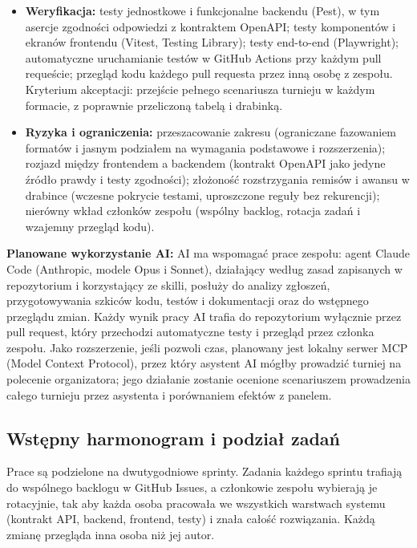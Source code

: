 \documentclass[11pt,a4paper,oneside]{article}
\newif\ifpodpowiedzi
\newcommand{\podpowiedz}[1]{\ifpodpowiedzi\par\begingroup\small\color{hintcolor}\textit{Wskazówka: #1}\par\endgroup\fi}
\begin{document}
\begin{itemize}
\item \textbf{Weryfikacja:} testy jednostkowe i funkcjonalne backendu (Pest), w tym asercje zgodności odpowiedzi z kontraktem OpenAPI; testy komponentów i ekranów frontendu (Vitest, Testing Library); testy end-to-end (Playwright); automatyczne uruchamianie testów w GitHub Actions przy każdym pull requeście; przegląd kodu każdego pull requesta przez inną osobę z zespołu. Kryterium akceptacji: przejście pełnego scenariusza turnieju w każdym formacie, z poprawnie przeliczoną tabelą i drabinką.
\item \textbf{Ryzyka i ograniczenia:} przeszacowanie zakresu (ograniczane fazowaniem formatów i jasnym podziałem na wymagania podstawowe i rozszerzenia); rozjazd między frontendem a backendem (kontrakt OpenAPI jako jedyne źródło prawdy i testy zgodności); złożoność rozstrzygania remisów i awansu w drabince (wczesne pokrycie testami, uproszczone reguły bez rekurencji); nierówny wkład członków zespołu (wspólny backlog, rotacja zadań i wzajemny przegląd kodu).
\end{itemize}

\podpowiedz{Jeżeli przewidujecie wykorzystanie AI, określcie, czy ma wspomagać prace, stanowić część rozwiązania, czy pełnić obie role. Jeśli AI jest elementem wymagań projektu, wskażcie sposób oceny jej działania. Gdy nie planujecie AI, wpiszcie tę informację.}
\textbf{Planowane wykorzystanie AI:} AI ma wspomagać prace zespołu: agent Claude Code (Anthropic, modele Opus i Sonnet), działający według zasad zapisanych w repozytorium i korzystający ze skilli, posłuży do analizy zgłoszeń, przygotowywania szkiców kodu, testów i dokumentacji oraz do wstępnego przeglądu zmian. Każdy wynik pracy AI trafia do repozytorium wyłącznie przez pull request, który przechodzi automatyczne testy i przegląd przez członka zespołu. Jako rozszerzenie, jeśli pozwoli czas, planowany jest lokalny serwer MCP (Model Context Protocol), przez który asystent AI mógłby prowadzić turniej na polecenie organizatora; jego działanie zostanie ocenione scenariuszem prowadzenia całego turnieju przez asystenta i porównaniem efektów z panelem.

\subsection{Wstępny harmonogram i podział zadań}
\podpowiedz{Podziel prace na etapy z konkretnymi terminami i sprawdzalnymi rezultatami. Wskaż osoby odpowiedzialne; przy zadaniach wspólnych określ indywidualne obowiązki. Uwzględnij czas na integrację, testy, dokumentację, nagranie i poprawki. W razie potrzeby dodaj wiersze.}
Prace są podzielone na dwutygodniowe sprinty. Zadania każdego sprintu trafiają do wspólnego backlogu w GitHub Issues, a członkowie zespołu wybierają je rotacyjnie, tak aby każda osoba pracowała we wszystkich warstwach systemu (kontrakt API, backend, frontend, testy) i znała całość rozwiązania. Każdą zmianę przegląda inna osoba niż jej autor.
\end{document}
